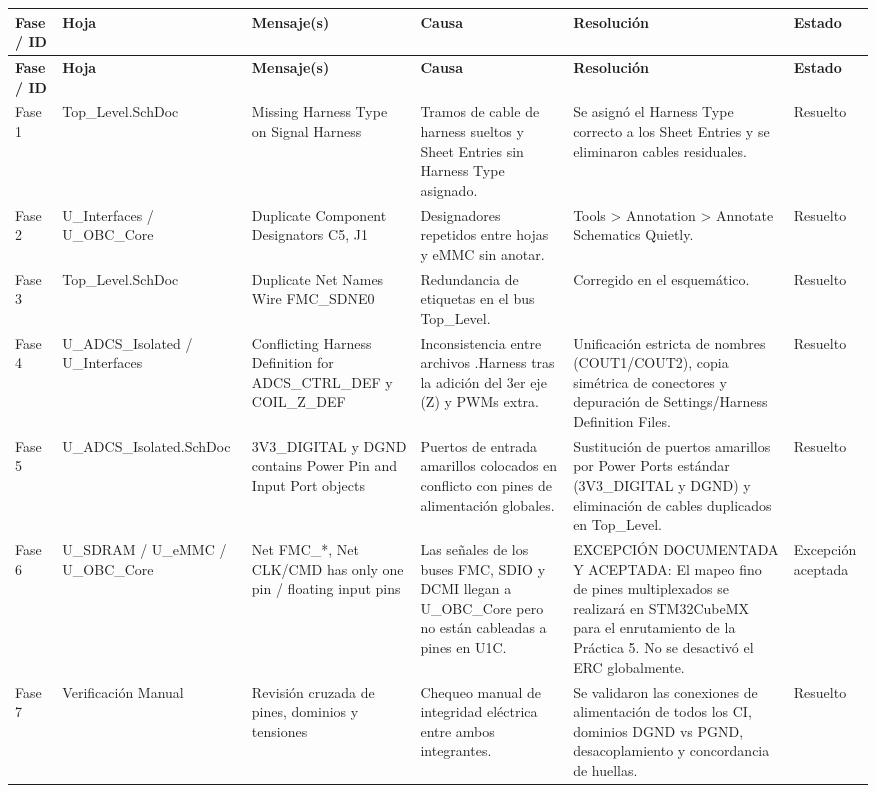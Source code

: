 \tiny
\setlength{\tabcolsep}{2.5pt}
\renewcommand{\arraystretch}{1.15}
\begin{longtable}{|>{\raggedright\arraybackslash}p{1.4cm}|>{\raggedright\arraybackslash}p{2.2cm}|>{\raggedright\arraybackslash}p{3.2cm}|>{\raggedright\arraybackslash}p{3.3cm}|>{\raggedright\arraybackslash}p{3.8cm}|>{\raggedright\arraybackslash}p{1.6cm}|}
\hline
\textbf{Fase / ID} & \textbf{Hoja} & \textbf{Mensaje(s)} & \textbf{Causa} & \textbf{Resolución} & \textbf{Estado} \\ \hline
\endfirsthead
\hline
\textbf{Fase / ID} & \textbf{Hoja} & \textbf{Mensaje(s)} & \textbf{Causa} & \textbf{Resolución} & \textbf{Estado} \\ \hline
\endhead
Fase 1 & Top\_Level.SchDoc & [Fatal Error] Missing Harness Type on Signal Harness & Tramos de cable de harness sueltos y Sheet Entries sin Harness Type asignado. & Se asignó el Harness Type correcto a los Sheet Entries y se eliminaron cables residuales. & Resuelto \\ \hline
Fase 2 & U\_Interfaces / U\_OBC\_Core & Duplicate Component Designators C5, J1 & Designadores repetidos entre hojas y eMMC sin anotar. & Tools > Annotation > Annotate Schematics Quietly. & Resuelto \\ \hline
Fase 3 & Top\_Level.SchDoc & Duplicate Net Names Wire FMC\_SDNE0 & Redundancia de etiquetas en el bus Top\_Level. & Corregido en el esquemático. & Resuelto \\ \hline
Fase 4 & U\_ADCS\_Isolated / U\_Interfaces & [Fatal Error] Conflicting Harness Definition for ADCS\_CTRL\_DEF y COIL\_Z\_DEF & Inconsistencia entre archivos .Harness tras la adición del 3er eje (Z) y PWMs extra. & Unificación estricta de nombres (COUT1/COUT2), copia simétrica de conectores y depuración de Settings/Harness Definition Files. & Resuelto \\ \hline
Fase 5 & U\_ADCS\_Isolated.SchDoc & [Error] 3V3\_DIGITAL y DGND contains Power Pin and Input Port objects & Puertos de entrada amarillos colocados en conflicto con pines de alimentación globales. & Sustitución de puertos amarillos por Power Ports estándar (3V3\_DIGITAL y DGND) y eliminación de cables duplicados en Top\_Level. & Resuelto \\ \hline
Fase 6 & U\_SDRAM / U\_eMMC / U\_OBC\_Core & [Error/Warning] Net FMC\_*, Net CLK/CMD has only one pin / floating input pins & Las señales de los buses FMC, SDIO y DCMI llegan a U\_OBC\_Core pero no están cableadas a pines en U1C. & EXCEPCIÓN DOCUMENTADA Y ACEPTADA: El mapeo fino de pines multiplexados se realizará en STM32CubeMX para el enrutamiento de la Práctica 5. No se desactivó el ERC globalmente. & Excepción aceptada \\ \hline
Fase 7 & Verificación Manual & Revisión cruzada de pines, dominios y tensiones & Chequeo manual de integridad eléctrica entre ambos integrantes. & Se validaron las conexiones de alimentación de todos los CI, dominios DGND vs PGND, desacoplamiento y concordancia de huellas. & Resuelto \\ \hline
\end{longtable}
\normalsize
